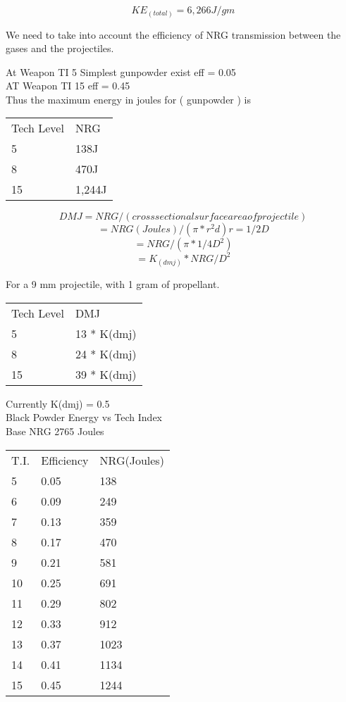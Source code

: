 \[KE_{(total)} = 6,266J/gm\]

We need to take into account the efficiency of NRG transmission 
between the gases and the projectiles. 

At Weapon TI 5 Simplest gunpowder exist	eff = 0.05 \\
AT Weapon TI 15 eff = 0.45 \\

Thus the maximum energy in joules for ( gunpowder ) is  
\begin{tabular}{||l|l||}
Tech Level  & NRG \\
	5 	    & 138J \\
	8	    & 470J \\
	15  	& 1,244J  \\
\end{tabular}
                 
\[DMJ 	= NRG/(cross sectional surface area of projectile)\]
\[= NRG(Joules)/(\pi * r^{2}d)  r = 1/2 D \]
\[= NRG/(\pi * 1/4 D^{2}) \]
\[= K_{(dmj)} * NRG/D^{2} \]

For a 9 mm projectile, with 1 gram of propellant.

\begin{tabular}{||l|l||}
Tech Level  & DMJ \\
	5		& 13 * K(dmj) \\
	8		& 24 * K(dmj) \\
	15		& 39 * K(dmj) \\
\end{tabular}

Currently K(dmj) = 0.5 \\
Black Powder Energy vs Tech Index \\
Base NRG     2765 Joules \\

\begin{tabular}{||l|l|l||}
T.I.   &  Efficiency    &    NRG(Joules) \\
5	   &	0.05        &    138 \\
6		& 0.09          &    249 \\
7		& 0.13          &    359 \\
8		& 0.17          &    470 \\
9      	& 0.21          &    581 \\
10     	& 0.25          &    691 \\
11     	& 0.29          &    802 \\
12     	& 0.33          &    912 \\
13     	& 0.37          &    1023 \\
14     	& 0.41          &    1134 \\
15     	& 0.45          &    1244 \\
\end{tabular}


